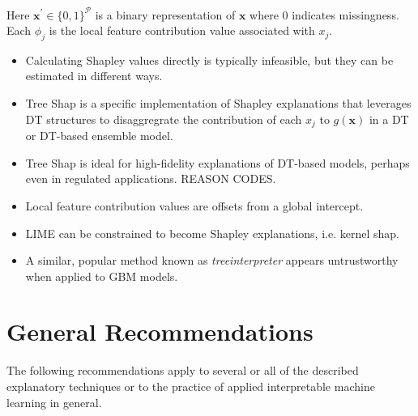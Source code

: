 \documentclass[11pt]{asaproc}
\begin{document}
Here $\mathbf{x}^\prime \in \{0,1\}^\mathcal{P}$ is a binary representation of $\mathbf{x}$ where 0 indicates missingness. Each $\phi_j$ is the local feature contribution value associated with $x_j$.

\begin{itemize}
	
	\item Calculating Shapley values directly is typically infeasible, but they can be estimated in different ways.
	
	\item Tree Shap is a specific implementation of Shapley explanations that leverages DT structures to disaggregrate the contribution of each $x_j$ to $g(\mathbf{x})$ in a DT or DT-based ensemble model. \cite{tree_shap}
	
\end{itemize}

\begin{itemize}
	
	\item Tree Shap is ideal for high-fidelity explanations of DT-based models, perhaps even in regulated applications. REASON CODES.
	
	\item Local feature contribution values are offsets from a global intercept.
	
	\item LIME can be constrained to become Shapley explanations, i.e. kernel shap.
	
	\item A similar, popular method known as \textit{treeinterpreter} appears untrustworthy when applied to GBM models. 
	
\end{itemize}

\section{General Recommendations} \label{sec:gen_rec}

The following recommendations apply to several or all of the described explanatory techniques or to the practice of applied interpretable machine learning in general.
\end{document}
